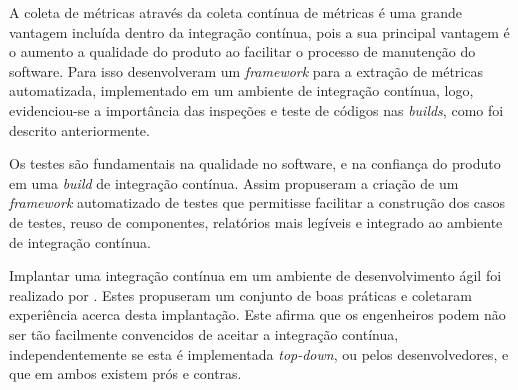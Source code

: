 A coleta de métricas através da coleta contínua de métricas é uma grande vantagem incluída dentro da integração contínua, pois a sua principal vantagem é o aumento a qualidade do produto ao facilitar o processo de manutenção do software. Para isso  desenvolveram um \textit{framework} para a extração de métricas automatizada, implementado em um ambiente de integração contínua, logo, evidenciou-se a importância das inspeções e teste de códigos nas \textit{builds}, como foi descrito anteriormente.

Os testes são fundamentais na qualidade no software, e na confiança do produto em uma \textit{build} de integração contínua. Assim  propuseram a criação de um \textit{framework} automatizado de testes que permitisse facilitar a  construção dos casos de testes, reuso de componentes, relatórios mais legíveis e integrado ao ambiente de integração contínua.

Implantar uma integração contínua em um ambiente de desenvolvimento ágil foi realizado por . Estes propuseram um conjunto de boas práticas e coletaram experiência acerca desta implantação. Este afirma que os engenheiros podem não ser tão facilmente convencidos de aceitar a integração contínua, independentemente se esta é implementada \textit{top-down}, ou pelos desenvolvedores, e que em ambos existem prós e contras.
